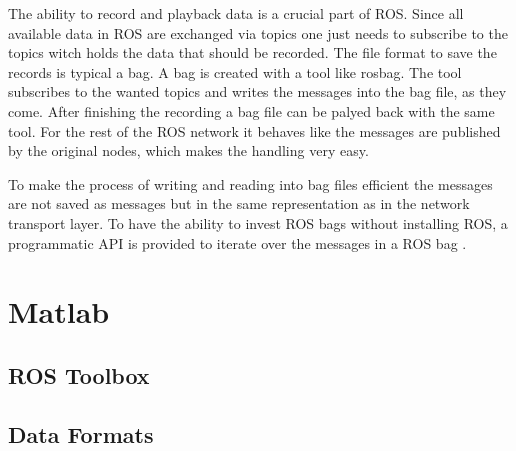 The ability to record and playback data is a crucial part of ROS.
Since all available data in ROS are exchanged via topics one just needs to subscribe to the topics witch holds the data that should be recorded.
The file format to save the records is typical a bag.
A bag is created with a tool like rosbag.
The tool subscribes to the wanted topics and writes the messages into the bag file, as they come.
After finishing the recording a bag file can be palyed back with the same tool.
For the rest of the ROS network it behaves like the messages are published by the original nodes, which makes the handling very easy.

To make the process of writing and reading into bag files efficient the messages are not saved as messages but in the same representation as in the network transport layer.
To have the ability to invest \ac{ROS} bags without installing \ac{ROS}, a programmatic API is provided to iterate over the messages in a \ac{ROS} bag \cite{rosBag}.


\section{Matlab}\label{sec:matlab}
	\subsection{ROS Toolbox}\label{ssec:rosToolbox}
	\subsection{Data Formats}\label{ssec:dataFormats}

